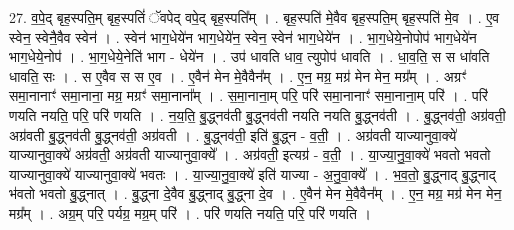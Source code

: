 \documentclass[17pt]{extarticle}
\begin{document}
27. व॒पे॒द् बृह॒स्पति॒म् बृह॒स्पतिं॑ ॅवपेद् वपे॒द् बृह॒स्पति᳚म् । . बृह॒स्पति॑ मे॒वैव बृह॒स्पति॒म् बृह॒स्पति॑ मे॒व । . ए॒व स्वेन॒ स्वेनै॒वैव स्वेन॑ । . स्वेन॑ भाग॒धेये॑न भाग॒धेये॑न॒ स्वेन॒ स्वेन॑ भाग॒धेये॑न । . भा॒ग॒धेये॒नोपोप॑ भाग॒धेये॑न भाग॒धेये॒नोप॑ । . भा॒ग॒धेये॒नेति॑ भाग - धेये॑न । . उप॑ धावति धाव॒ त्युपोप॑ धावति । . धा॒व॒ति॒ स स धा॑वति धावति॒ सः । . स ए॒वैव स स ए॒व । . ए॒वैन॑ मेन मे॒वैवैन᳚म् । . ए॒न॒ मग्र॒ मग्र॑ मेन मेन॒ मग्र᳚म् । . अग्रꣳ॑ समा॒नानाꣳ॑ समा॒नाना॒ मग्र॒ मग्रꣳ॑ समा॒नाना᳚म् । . स॒मा॒नाना॒म् परि॒ परि॑ समा॒नानाꣳ॑ समा॒नाना॒म् परि॑ । . परि॑ णयति नयति॒ परि॒ परि॑ णयति । . न॒य॒ति॒ बु॒द्ध्नव॑ती बु॒द्ध्नव॑ती नयति नयति बु॒द्ध्नव॑ती । . बु॒द्ध्नव॑ती॒ अग्र॑वती॒ अग्र॑वती बु॒द्ध्नव॑ती बु॒द्ध्नव॑ती॒ अग्र॑वती । . बु॒द्ध्नव॑ती॒ इति॑ बु॒द्ध्न - व॒ती॒ । . अग्र॑वती याज्यानुवा॒क्ये॑ याज्यानुवा॒क्ये॑ अग्र॑वती॒ अग्र॑वती याज्यानुवा॒क्ये᳚ । . अग्र॑वती॒ इत्यग्र॑ - व॒ती॒ । . या॒ज्या॒नु॒वा॒क्ये॑ भवतो भवतो याज्यानुवा॒क्ये॑ याज्यानुवा॒क्ये॑ भवतः । . या॒ज्या॒नु॒वा॒क्ये॑ इति॑ याज्या - अ॒नु॒वा॒क्ये᳚ । . भ॒व॒तो॒ बु॒द्ध्नाद् बु॒द्ध्नाद् भ॑वतो भवतो बु॒द्ध्नात् । . बु॒द्ध्ना दे॒वैव बु॒द्ध्नाद् बु॒द्ध्ना दे॒व । . ए॒वैन॑ मेन मे॒वैवैन᳚म् । . ए॒न॒ मग्र॒ मग्र॑ मेन मेन॒ मग्र᳚म् । . अग्र॒म् परि॒ पर्यग्र॒ मग्र॒म् परि॑ । . परि॑ णयति नयति॒ परि॒ परि॑ णयति । \newline
\end{document}
